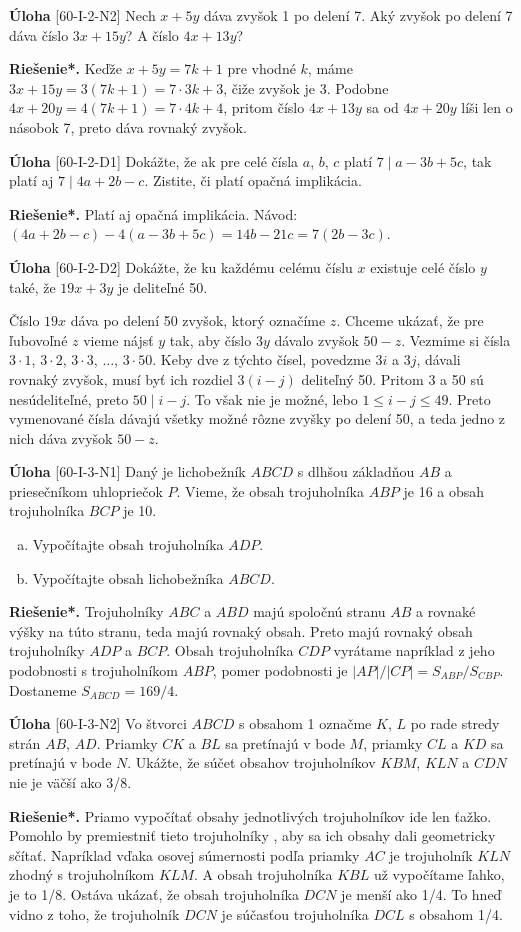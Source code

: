 \documentclass{article}
\newcommand{\rieh}{\textbf{Riešenie*.} }
\newcommand{\problem}[4]{
  \begin{tcolorbox}[breakable,notitle,boxrule=0pt,colback=light-gray,colframe=light-gray]
    \textbf{Úloha}
    [#1] #3
  \end{tcolorbox}
  \noindent#4
}
\begin{document}
\problem{60-I-2-N2}{}{
Nech $x + 5y$ dáva zvyšok 1 po delení 7. Aký zvyšok po delení 7 dáva číslo $3x + 15y$? A číslo $4x + 13y$?
}{
\rieh Keďže $x + 5y = 7k + 1$ pre vhodné $k$, máme $3x + 15y = 3(7k + 1) = 7 \cdot 3k + 3$, čiže zvyšok je 3. Podobne $4x + 20y = 4(7k + 1) = 7 \cdot 4k + 4$, pritom číslo
$4x + 13y$ sa od $4x + 20y$ líši len o násobok 7, preto dáva rovnaký zvyšok.
}


\problem{60-I-2-D1}{}{
Dokážte, že ak pre celé čísla $a$, $b$, $c$ platí $7 \mid a - 3b + 5c$, tak platí aj $7 \mid 4a + 2b - c$. Zistite, či platí opačná implikácia.
}{
\rieh Platí aj opačná implikácia. Návod: $(4a + 2b - c) - 4(a - 3b + 5c) = 14b - 21c = 7(2b - 3c)$.
}

\problem{60-I-2-D2}{}{
Dokážte, že ku každému celému číslu $x$ existuje celé číslo $y$ také, že $19x+3y$ je deliteľné 50.
}{
Číslo $19x$ dáva po delení 50 zvyšok, ktorý označíme $z$. Chceme ukázať, že pre
ľubovoľné $z$ vieme nájsť $y$ tak, aby číslo $3y$ dávalo zvyšok $50 - z$. Vezmime si čísla
$3 \cdot 1$, $3 \cdot 2$, $3 \cdot 3$, $\ldots$, $3 \cdot 50$. Keby dve z týchto čísel, povedzme $3i$ a $3j$, dávali rovnaký
zvyšok, musí byť ich rozdiel $3(i - j)$ deliteľný 50. Pritom 3 a 50 sú nesúdeliteľné, preto $50 \mid i - j$. To však nie je možné, lebo $1 \leq  i - j \leq 49$. Preto vymenované čísla dávajú všetky možné rôzne zvyšky po delení 50, a teda jedno z nich dáva zvyšok $50 - z$.
}


\problem{60-I-3-N1}{}{
Daný je lichobežník $ABCD$ s dlhšou základňou $AB$ a priesečníkom uhlopriečok $P$.
Vieme, že obsah trojuholníka $ABP$ je 16 a obsah trojuholníka $BCP$ je 10.
\begin{enumerate}[a)]
    \item Vypočítajte obsah trojuholníka $ADP$.
    \item Vypočítajte obsah lichobežníka $ABCD$.
\end{enumerate}
}{
\rieh Trojuholníky $ABC$ a $ABD$ majú spoločnú stranu $AB$ a rovnaké výšky na túto stranu, teda majú rovnaký obsah. Preto majú rovnaký obsah trojuholníky $ADP$ a $BCP$. Obsah trojuholníka $CDP$ vyrátame napríklad z jeho podobnosti s trojuholníkom $ABP$, pomer podobnosti je $| AP | / | CP | = S_{ABP}/S_{CBP}$. Dostaneme $S_{ABCD} = 169/4$.
}


\problem{60-I-3-N2}{}{
Vo štvorci $ABCD$ s obsahom 1 označme $K$, $L$ po rade stredy strán $AB$, $AD$. Priamky $CK$ a $BL$ sa pretínajú v bode $M$, priamky $CL$ a $KD$ sa pretínajú v bode $N$. Ukážte, že súčet obsahov trojuholníkov $KBM$, $KLN$ a $CDN$ nie je väčší ako 3/8.
}{
\rieh Priamo vypočítať obsahy jednotlivých trojuholníkov ide len ťažko. Pomohlo by premiestniť tieto trojuholníky \uv{viac k sebe}, aby sa ich obsahy dali geometricky sčítať. Napríklad vďaka osovej súmernosti podľa priamky $AC$ je trojuholník $KLN$ zhodný s trojuholníkom $KLM$. A obsah trojuholníka $KBL$ už vypočítame ľahko, je to 1/8. Ostáva ukázať, že obsah trojuholníka $DCN$ je menší ako 1/4. To hneď vidno z toho, že trojuholník $DCN$ je súčasťou trojuholníka $DCL$ s obsahom 1/4.
}
\end{document}
